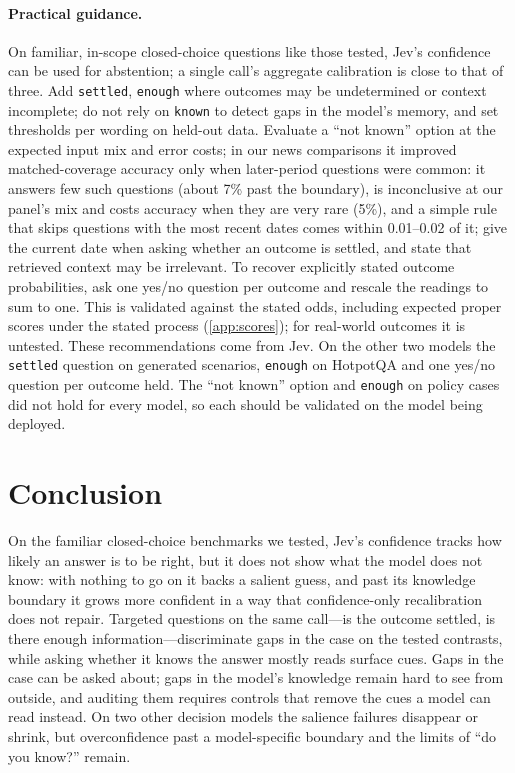 \documentclass[10pt,twocolumn]{article}
\begin{document}
\paragraph{Practical guidance.} On familiar, in-scope closed-choice questions
like those tested, Jev's confidence can be used for abstention; a single call's aggregate calibration is close
to that of three. Add \texttt{settled},
\texttt{enough} where outcomes may be undetermined or context incomplete; do
not rely on \texttt{known} to detect gaps in the model's memory, and set thresholds per wording on held-out
data. Evaluate a ``not known'' option at the expected input mix and error
costs; in our news comparisons it improved matched-coverage accuracy only when
later-period questions were common: it answers few such questions (about 7\% past the boundary),
is inconclusive at our panel's mix and costs accuracy when they are very rare (5\%), and a
simple rule that skips questions with the most recent dates comes within
0.01--0.02 of it; give the current date when asking whether an outcome is
settled, and state that retrieved context may be irrelevant. To recover explicitly stated outcome probabilities, ask one
yes/no question per outcome and rescale the readings to sum to one. This is
validated against the stated odds, including expected proper scores under the
stated process (\cref{app:scores}); for real-world outcomes it is untested.
These recommendations come from Jev. On the other two models the
\texttt{settled} question on generated scenarios, \texttt{enough} on
HotpotQA and one yes/no question per outcome held. The ``not known'' option
and \texttt{enough} on policy cases did not hold for every model, so each
should be validated on the model being deployed.

\section{Conclusion}

On the familiar closed-choice benchmarks we tested, Jev's confidence tracks
how likely an answer is to be right, but it does not show what the model does
not know: with nothing to go on
it backs a salient guess, and past its knowledge boundary it grows more
confident in a way that confidence-only recalibration does not repair.
Targeted questions on the same call---is the outcome settled, is there enough
information---discriminate gaps in the case on the tested contrasts, while
asking whether it knows the answer mostly reads surface cues. Gaps in the case
can be asked about; gaps in the model's knowledge remain hard to see from
outside, and auditing them requires
controls that remove the cues a model can read instead. On two other
decision models the salience failures disappear or shrink, but overconfidence
past a model-specific boundary and the limits of ``do you know?'' remain.
\end{document}
